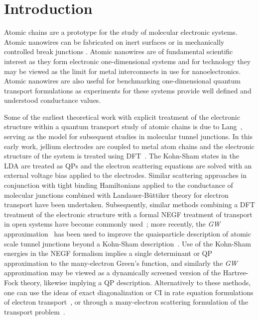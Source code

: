 \section{Introduction}

Atomic chains are a prototype for the study of
molecular electronic systems. Atomic nanowires can be fabricated on
inert surfaces \cite{segovia1999nature,nilius2002science} or in
mechanically controlled break junctions \cite{vanruitenbeek1998mcbj}.
Atomic nanowires are of fundamental scientific interest as they form
electronic one-dimensional systems and for technology they may be viewed
as the limit for metal interconnects in use for nanoelectronics.  Atomic
nanowires are also useful for benchmarking one-dimensional quantum
transport formulations as experiments for these systems provide well
defined and understood conductance values.

Some of the earliest theoretical work with explicit treatment of the
electronic structure within a quantum transport study of atomic chains is
due to Lang~\cite{Lang1995prb}, serving as the model for subsequent
studies in molecular tunnel junctions. In this early work, jellium
electrodes are coupled to metal atom chains and the electronic structure
of the system is treated using
\ac{DFT}~\cite{hohenberg_kohn, kohn_sham, kohn_dftreview}.
The Kohn-Sham states in the \ac{LDA} are treated as \acp{QP} and the
electron scattering equations are solved with an external voltage bias
applied to the electrodes. Similar scattering approaches in conjunction
with tight binding Hamiltonians applied to the conductance of molecular
junctions combined with Landauer-B\"uttiker theory for electron transport
\cite{emberlykirczenow1999standingwave,
emberlykirczenow2000molecularwire} have been undertaken. 
Subsequently, similar methods combining a 
\ac{DFT} treatment of the electronic structure with a formal \ac{NEGF}
treatment of transport in open systems have become commonly
used~\cite{damle_ghosh_datta}; more
recently, the {\it GW} approximation~\cite{hedin1965gw} has been used to
improve  the quaisparticle description of atomic scale tunnel junctions
beyond a Kohn-Sham description~\cite{thygesen_rubio,neaton2007amines}.
Use of the Kohn-Sham energies in the NEGF formalism implies a single
determinant or \ac{QP} approximation to the many-electron Green's function,
and similarly the {\it GW} approximation may be viewed as a dynamically
screened version of the Hartree-Fock theory, likewise implying a
\ac{QP} description. Alternatively to these methods, one can use the
ideas of exact diagonalization or \ac{CI} in rate equation formulations
of electron transport~\cite{pedersen_many_body_tunneling}, or through a
many-electron scattering formulation of the transport
problem~\cite{vici2004,greer2011}. 


